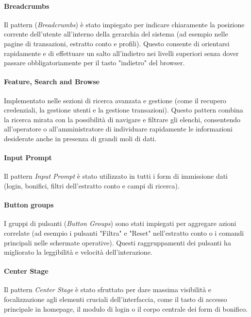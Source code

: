 \paragraph{Breadcrumbs}
Il pattern (\textit{Breadcrumbs}) è stato impiegato per indicare chiaramente la posizione corrente dell'utente all'interno della gerarchia del sistema (ad esempio nelle pagine di transazioni, estratto conto e profili). Questo consente di orientarsi rapidamente e di effettuare un salto all'indietro nei livelli superiori senza dover passare obbligatoriamente per il tasto "indietro" del browser.

\paragraph{Feature, Search and Browse}
Implementato nelle sezioni di ricerca avanzata e gestione (come il recupero credenziali, la gestione utenti e la gestione transazioni). Questo pattern combina la ricerca mirata con la possibilità di navigare e filtrare gli elenchi, consentendo all'operatore o all'amministratore di individuare rapidamente le informazioni desiderate anche in presenza di grandi moli di dati.

\paragraph{Input Prompt}
Il pattern \textit{Input Prompt} è stato utilizzato in tutti i form di immissione dati (login, bonifici, filtri dell'estratto conto e campi di ricerca).

\paragraph{Button groups}
I gruppi di pulsanti (\textit{Button Groups}) sono stati impiegati per aggregare azioni correlate (ad esempio i pulsanti "Filtra" e "Reset" nell'estratto conto o i comandi principali nelle schermate operative). Questi raggruppamenti dei pulsanti ha migliorato la leggibilità e velocità dell'interazione.

\paragraph{Center Stage}
Il pattern \textit{Center Stage} è stato sfruttato per dare massima visibilità e focalizzazione agli elementi cruciali dell'interfaccia, come il tasto di accesso principale in homepage, il modulo di login o il corpo centrale dei form di bonifico.

